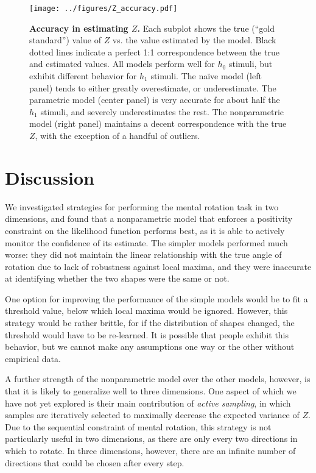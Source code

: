 \documentclass{article} %
\newcommand{\naive}[0]{na\"ive}
\begin{document}
\begin{figure}[t]
  \centering
  \texttt{[image: ../figures/Z\_accuracy.pdf]}
  \caption{\textbf{Accuracy in estimating $Z$.} Each subplot shows the
    true (``gold standard'') value of $Z$ vs. the value estimated by
    the model. Black dotted lines indicate a perfect 1:1
    correspondence between the true and estimated values. All models
    perform well for $h_0$ stimuli, but exhibit different behavior for
    $h_1$ stimuli. The \naive{} model (left panel) tends to either
    greatly overestimate, or underestimate. The parametric model
    (center panel) is very accurate for about half the $h_1$ stimuli,
    and severely underestimates the rest. The nonparametric model
    (right panel) maintains a decent correspondence with the true $Z$,
    with the exception of a handful of outliers.}
  \label{fig:accuracy}
\end{figure}

\section{Discussion}

We investigated strategies for performing the mental rotation task
\cite{Shepard1971} in two dimensions, and found that a nonparametric
model that enforces a positivity constraint on the likelihood function
performs best, as it is able to actively monitor the confidence of its
estimate. The simpler models performed much worse: they did not
maintain the linear relationship with the true angle of rotation due
to lack of robustness against local maxima, and they were inaccurate
at identifying whether the two shapes were the same or not.

One option for improving the performance of the simple models would be
to fit a threshold value, below which local maxima would be
ignored. However, this strategy would be rather brittle, for if the
distribution of shapes changed, the threshold would have to be
re-learned. It is possible that people exhibit this behavior, but we
cannot make any assumptions one way or the other without empirical
data.

A further strength of the nonparametric model over the other models,
however, is that it is likely to generalize well to three
dimensions. One aspect of \cite{Osborne:2012tm} which we have not yet
explored is their main contribution of \textit{active sampling}, in
which samples are iteratively selected to maximally decrease the
expected variance of $Z$. Due to the sequential constraint of mental
rotation, this strategy is not particularly useful in two dimensions,
as there are only every two directions in which to rotate. In three
dimensions, however, there are an infinite number of directions that
could be chosen after every step.
\end{document}

